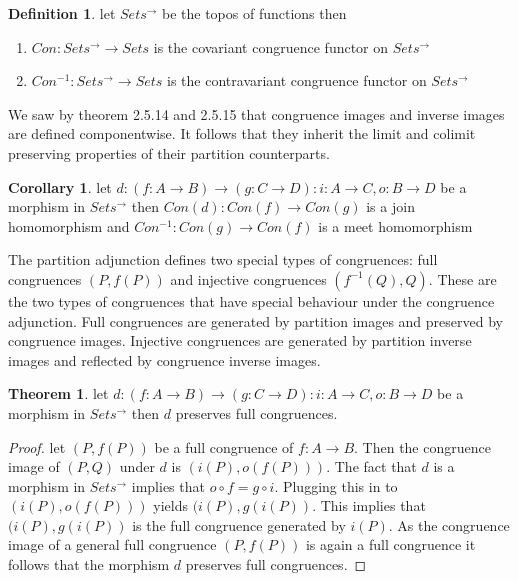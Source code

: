 \documentclass[a4paper,11pt, notitlepage]{report}
\theoremstyle{definition}
\newtheorem{definition}{Definition}[section]
\newtheorem{theorem}{Theorem}[section]
\newtheorem{corollary}{Corollary}[section]
\begin{document}
\begin{definition}
let $Sets^{\to}$ be the topos of functions then
\begin{enumerate}
 \item $Con : Sets^{\to} \to Sets$ is the covariant congruence functor on $Sets^{\to}$
 \item $Con^{-1} : Sets^{\to} \to Sets$ is the contravariant congruence functor on $Sets^{\to}$
\end{enumerate}
\end{definition}

 We saw by theorem 2.5.14 and 2.5.15 that congruence images and inverse images are defined componentwise. It follows that they inherit the limit and colimit preserving properties of their partition counterparts.

\begin{corollary}
let $d: (f: A \to B) \to (g: C \to D) : i : A \to C, o : B \to D$ be a morphism in $Sets^{\to}$ then $Con(d) : Con(f) \to Con(g)$ is a join homomorphism and $Con^{-1} : Con(g) \to Con(f)$ is a meet homomorphism
\end{corollary}

The partition adjunction defines two special types of congruences: full congruences $(P,f(P))$ and injective congruences $(f^{-1}(Q),Q)$. These are the two types of congruences that have special behaviour under the congruence adjunction. Full congruences are generated by partition images and preserved by congruence images. Injective congruences are generated by partition inverse images and reflected by congruence inverse images.

\begin{theorem}
let $d: (f: A \to B) \to (g: C \to D) : i : A \to C, o : B \to D$ be a morphism in $Sets^{\to}$ then $d$ preserves full congruences.
\end{theorem}

\begin{proof}
let $(P,f(P))$ be a full congruence of $f: A \to B$. Then the congruence image of $(P,Q)$ under $d$ is $(i(P),o(f(P)))$. The fact that $d$ is a morphism in $Sets^{\to}$ implies that $o \circ f = g \circ i$. Plugging this in to $(i(P),o(f(P)))$ yields $(i(P), g(i(P))$. This implies that $(i(P),g(i(P))$ is the full congruence generated by $i(P)$. As the congruence image of a general full congruence $(P,f(P))$ is again a full congruence it follows that the morphism $d$ preserves full congruences.
\end{proof}
\end{document}
